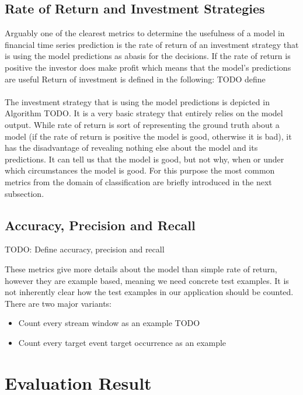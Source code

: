 \subsection{Rate of Return and Investment Strategies}
Arguably one of the clearest metrics to determine the usefulness of a model in financial time series prediction is the rate of return of an investment strategy that is using the model predictions as abasis for the decisions. If the rate of return is positive the investor does make profit which means that the model's predictions are useful Return of investment is defined in the following: TODO define
\\
\\
The investment strategy that is using the model predictions is depicted in Algorithm TODO. It is a very basic strategy that entirely relies on the model output. While rate of return is sort of representing the ground truth about a model (if the rate of return is positive the model is good, otherwise it is bad), it has the disadvantage of revealing nothing else about the model and its predictions. It can tell us that the model is good, but not why, when or under which circumstances the model is good. For this purpose the most common metrics from the domain of classification are briefly introduced in the next subsection.

\subsection{Accuracy, Precision and Recall}
TODO: Define accuracy, precision and recall

These metrics give more details about the model than simple rate of return, however they are example based, meaning we need concrete test examples. It is not inherently clear how the test examples in our application should be counted. There are two major variants:

\begin{itemize}
	\item Count every stream window as an example TODO
	\item Count every target event target occurrence as an example
\end{itemize}

\section{Evaluation Result}
\label{sec_evaluationResults}

